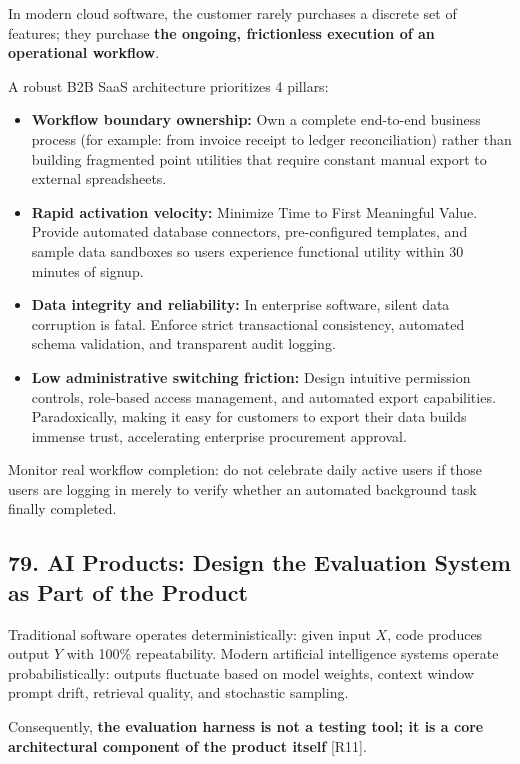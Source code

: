 In modern cloud software, the customer rarely purchases a discrete set of features; they purchase \textbf{the ongoing, frictionless execution of an operational workflow}.

A robust B2B SaaS architecture prioritizes 4 pillars:
\begin{itemize}
    \item \textbf{Workflow boundary ownership:} Own a complete end-to-end business process (for example: from invoice receipt to ledger reconciliation) rather than building fragmented point utilities that require constant manual export to external spreadsheets.
    \item \textbf{Rapid activation velocity:} Minimize Time to First Meaningful Value. Provide automated database connectors, pre-configured templates, and sample data sandboxes so users experience functional utility within 30 minutes of signup.
    \item \textbf{Data integrity and reliability:} In enterprise software, silent data corruption is fatal. Enforce strict transactional consistency, automated schema validation, and transparent audit logging.
    \item \textbf{Low administrative switching friction:} Design intuitive permission controls, role-based access management, and automated export capabilities. Paradoxically, making it easy for customers to export their data builds immense trust, accelerating enterprise procurement approval.
\end{itemize}

Monitor real workflow completion: do not celebrate daily active users if those users are logging in merely to verify whether an automated background task finally completed.

\subsection*{79. AI Products: Design the Evaluation System as Part of the Product}

Traditional software operates deterministically: given input $X$, code produces output $Y$ with 100\% repeatability. Modern artificial intelligence systems operate probabilistically: outputs fluctuate based on model weights, context window prompt drift, retrieval quality, and stochastic sampling.

Consequently, \textbf{the evaluation harness is not a testing tool; it is a core architectural component of the product itself} [R11].

